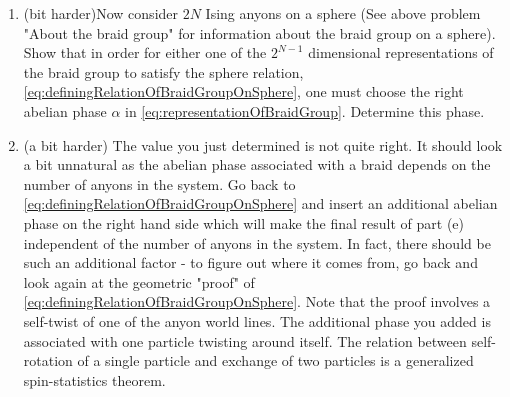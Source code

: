 \documentclass{book}
\begin{document}
\begin{enumerate}
\item (bit harder)Now consider $2N$ Ising anyons on a sphere (See above problem "About the braid group" for information about the braid group on a sphere). Show that in order for either one of the $2^{N-1}$ dimensional representations of the braid group to satisfy the sphere relation, \eqref{eq:definingRelationOfBraidGroupOnSphere}, one must choose the right abelian phase $\alpha $ in \eqref{eq:representationOfBraidGroup}. Determine this phase.
\item (a bit harder) The value you just determined is not quite right. It should look a bit unnatural as the abelian phase associated with a braid depends on the number of anyons in the system. Go back to \eqref{eq:definingRelationOfBraidGroupOnSphere} and insert an additional abelian phase on the right hand side which will make the final result of part (e) independent of the number of anyons in the system. In fact, there should be such an additional factor - to figure out where it comes from, go back and look again at the geometric "proof" of \eqref{eq:definingRelationOfBraidGroupOnSphere}. Note that the proof involves a self-twist of one of the anyon world lines. The additional phase you added is associated with one particle twisting around itself. The relation between self-rotation of a single particle and exchange of two particles is a generalized spin-statistics theorem.
\end{enumerate}
\end{document}
